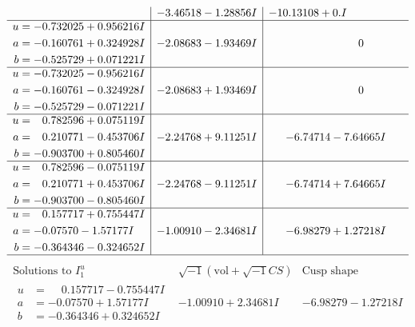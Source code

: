 \documentclass[1p]{elsarticle_modified}
\theoremstyle{definition}
\newcommand{\I}{\sqrt{-1}}
\begin{document}
$$\begin{array}{c|c|c}
 & -3.46518 - 1.28856 I & -10.13108 + 0. I\phantom{ +0.000000I} \\ \hline\begin{aligned}
u &= -0.732025 + 0.956216 I \\
a &= -0.160761 + 0.324928 I \\
b &= -0.525729 + 0.071221 I\end{aligned}
 & -2.08683 - 1.93469 I & \phantom{-0.000000 } 0 \\ \hline\begin{aligned}
u &= -0.732025 - 0.956216 I \\
a &= -0.160761 - 0.324928 I \\
b &= -0.525729 - 0.071221 I\end{aligned}
 & -2.08683 + 1.93469 I & \phantom{-0.000000 } 0 \\ \hline\begin{aligned}
u &= \phantom{-}0.782596 + 0.075119 I \\
a &= \phantom{-}0.210771 - 0.453706 I \\
b &= -0.903700 + 0.805460 I\end{aligned}
 & -2.24768 + 9.11251 I & -6.74714 - 7.64665 I \\ \hline\begin{aligned}
u &= \phantom{-}0.782596 - 0.075119 I \\
a &= \phantom{-}0.210771 + 0.453706 I \\
b &= -0.903700 - 0.805460 I\end{aligned}
 & -2.24768 - 9.11251 I & -6.74714 + 7.64665 I \\ \hline\begin{aligned}
u &= \phantom{-}0.157717 + 0.755447 I \\
a &= -0.07570 - 1.57177 I \\
b &= -0.364346 - 0.324652 I\end{aligned}
 & -1.00910 - 2.34681 I & -6.98279 + 1.27218 I\\
 \hline 
 \end{array}$$\newpage$$\begin{array}{c|c|c}  
\text{Solutions to }I^u_{1}& \I (\text{vol} + \sqrt{-1}CS) & \text{Cusp shape}\\
 \hline 
\begin{aligned}
u &= \phantom{-}0.157717 - 0.755447 I \\
a &= -0.07570 + 1.57177 I \\
b &= -0.364346 + 0.324652 I\end{aligned}
 & -1.00910 + 2.34681 I & -6.98279 - 1.27218 I \\ \hline\begin{aligned}

\end{aligned}
\end{array}$$
\end{document}
